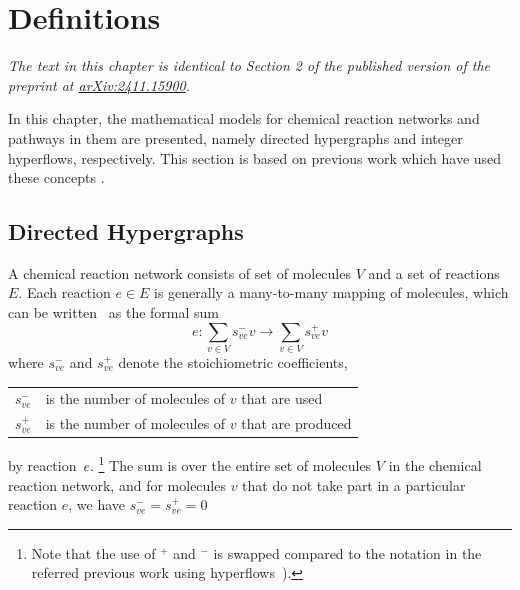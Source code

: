 \chapter{Definitions}
\label{ch:toolbox}

{\sffamily\slshape The text in this chapter is identical to Section 2 of the published version of the preprint at \href{https://arxiv.org/abs/2411.15900}{arXiv:2411.15900}.\\}

In this chapter, the mathematical models for chemical reaction networks and pathways in them are presented,
namely directed hypergraphs and integer hyperflows, respectively.
This section is based on previous work which have used these concepts \cite{jakob_reactions_hypergraph,jakob_integer_hyperflows}. 

\section{Directed Hypergraphs}
\label{sec:hypergraphs}

A chemical reaction network consists of set of molecules $V$ and a set of reactions $E$.
Each reaction $e\in E$ is generally a many-to-many mapping of molecules,
which can be written~\cite{christoph_reaction_network_chemical} as the formal sum
\begin{equation*}
        e \colon \sum_{v\in V} s_{ve}^{-} v \longrightarrow \sum_{v\in V} s_{ve}^{+} v 
        \label{chemical_equation}
\end{equation*}
where $s_{ve}^{-}$ and $s_{ve}^{+}$ denote the stoichiometric coefficients,\\
\begin{tabular}{ll}
$s_{ve}^{-}$ & is the number of molecules of $v$ that are used \\
$s_{ve}^{+}$ & is the number of molecules of $v$ that are produced \\
\end{tabular}

\noindent by reaction~$e$.
\footnote{Note that the use of $^+$ and $^-$ is swapped compared to the notation in the referred previous work using hyperflows~\cite{jakob_integer_hyperflows}).}
The sum is over the entire set of molecules $V$ in the chemical reaction network,
and for molecules $v$ that do not take part in a particular reaction $e$, we have $s^-_{ve} = s^+_{ve} = 0$


